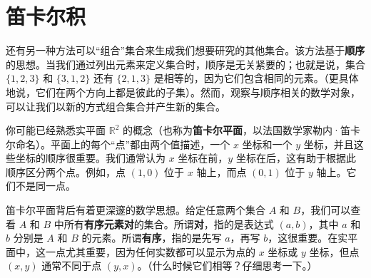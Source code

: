 \section{笛卡尔积}

还有另一种方法可以``组合''集合来生成我们想要研究的其他集合。该方法基于\textbf{顺序}的思想。当我们通过列出元素来定义集合时，顺序是无关紧要的；也就是说，集合 $\{1, 2, 3\}$ 和 $\{3, 1, 2\}$ 还有 $\{2, 1, 3\}$ 是相等的，因为它们包含相同的元素。（更具体地说，它们在两个方向上都是彼此的子集）。然而，观察与顺序相关的数学对象，可以让我们以新的方式组合集合并产生新的集合。

你可能已经熟悉实平面 $\mathbb{R}^2$ 的概念（也称为\textbf{笛卡尔平面}，以法国数学家勒内·笛卡尔命名）。平面上的每个``点''都由两个值描述，一个 $x$ 坐标和一个 $y$ 坐标，并且这些坐标的顺序很重要。我们通常认为 $x$ 坐标在前，$y$ 坐标在后，这有助于根据此顺序区分两个点。例如，点 $(1, 0)$ 位于 $x$ 轴上，而点 $(0, 1)$ 位于 $y$ 轴上。它们不是同一点。

笛卡尔平面背后有着更深邃的数学思想。给定任意两个集合 $A$ 和 $B$，我们可以查看 $A$ 和 $B$ 中所有\textbf{有序元素对}的集合。所谓\textbf{对}，指的是表达式 $(a, b)$，其中 $a$ 和 $b$ 分别是 $A$ 和 $B$ 的元素。所谓\textbf{有序}，指的是先写 $a$，再写 $b$，这很重要。在实平面中，这一点尤其重要，因为任何实数都可以显示为点的 $x$ 坐标或 $y$ 坐标，但点 $(x, y)$ 通常不同于点 $(y, x)$。（什么时候它们相等？仔细思考一下。）





